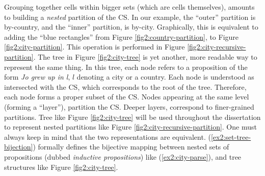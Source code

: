 Grouping together cells within bigger sets (which are cells themselves), amounts to building a \textit{nested} partition of the CS. In our example, the ``outer'' partition is by-country, and the ``inner'' partition, is by-city. Graphically, this is equivalent to adding the ``blue rectangles'' from Figure \ref{fig2:country-partition}, to Figure \ref{fig2:city-partition}. This operation is performed in Figure \ref{fig2:city-recursive-partition}. The tree in Figure \ref{fig2:city-tree} is yet another, more readable way to represent the same thing. In this tree, each node refers to a proposition of the form \textit{Jo grew up in l}, $l$ denoting a city or a country. Each node is understood as intersected with the CS, which corresponds to the root of the tree. Therefore, each node forms a proper subset of the CS. Nodes appearing at the same level (forming a ``layer''), partition the CS. Deeper layers, correspond to finer-grained partitions. Tree like Figure \ref{fig2:city-tree} will be used throughout the dissertation to represent nested partitions like Figure \ref{fig2:city-recursive-partition}. One must always keep in mind that the two representations are equivalent. (\ref{ex2:set-tree-bijection}) formally defines the bijective mapping between nested sets of propositions (dubbed \textit{inductive propositions}) like (\ref{ex2:city-parse}), and tree structures like Figure \ref{fig2:city-tree}.

